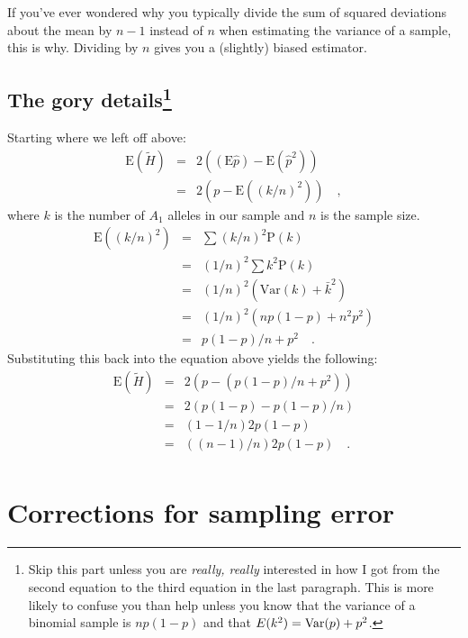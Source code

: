 If you've ever wondered why you typically divide the sum of squared
deviations about the mean by $n-1$ instead of $n$ when estimating the
variance of a sample, this is why. Dividing by $n$ gives you a
(slightly) biased estimator.

\subsection*{The gory details\footnote{Skip this part unless
  you are {\it really, really\/} interested in how I got from the
second equation to the third equation in the last paragraph. This is
more likely to confuse you than help unless you know that the variance
of a binomial sample is $np(1-p)$ and that $E(k^2) = \hbox{Var}(p) +
p^2$.}}

Starting where we left off above:
\begin{eqnarray*}
\mbox{E}(\tilde H) &=& 2\left((\mbox{E}\hat p) - \mbox{E}({\hat p}^2)\right) \\
     &=& 2\left(p - \mbox{E}\left((k/n)^2\right)\right) \quad ,
\end{eqnarray*}
where $k$ is the number of $A_1$ alleles in our sample and $n$ is the
sample size.
\begin{eqnarray*}
\mbox{E}\left((k/n)^2\right) &=& \sum (k/n)^2 \mbox{P}(k) \\
                      &=& (1/n)^2 \sum k^2 \mbox{P}(k) \\
                      &=& (1/n)^2 \left(\mbox{Var}(k) + \bar k^2\right) \\
                      &=& (1/n)^2 \left(np(1-p) + n^2p^2\right) \\
                      &=& p(1-p)/n + p^2 \quad .
\end{eqnarray*}
Substituting this back into the equation above yields the following:
\begin{eqnarray*}
\mbox{E}(\tilde H) &=& 2\left(p - \left(p(1-p)/n + p^2\right)\right) \\
     &=& 2\left(p(1-p) - p(1-p)/n\right) \\
     &=& \left(1 - 1/n\right)2p(1-p) \\
     &=& ((n-1)/n)2p(1-p) \quad . \\
\end{eqnarray*}

\section*{Corrections for sampling error}

